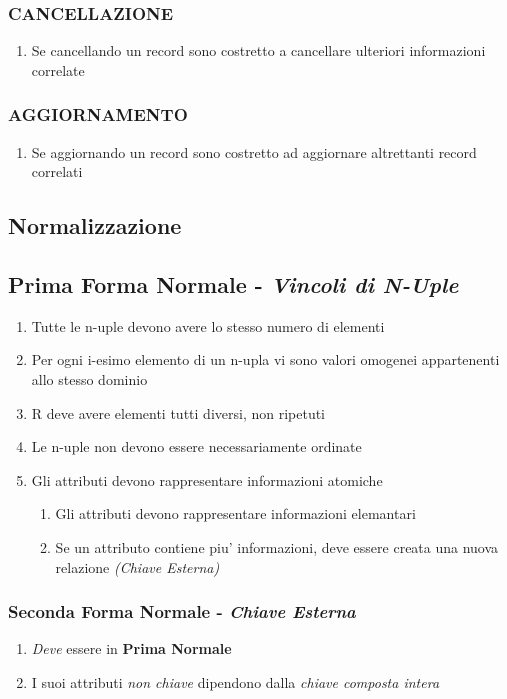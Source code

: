 \documentclass[a4paper, 12pt]{report}
\begin{document}
   \subsubsection{CANCELLAZIONE}
   \begin{enumerate}
       \item Se cancellando un record sono costretto a cancellare ulteriori informazioni correlate
   \end{enumerate}
   \subsubsection{AGGIORNAMENTO}
   \begin{enumerate}
       \item Se aggiornando un record sono costretto ad aggiornare altrettanti record correlati
   \end{enumerate}
   \subsection{Normalizzazione}
   \subsection{Prima Forma Normale -\textit{ Vincoli di N-Uple}}
   \begin{enumerate}
       \item Tutte le n-uple devono avere lo stesso numero di elementi
       \item Per ogni i-esimo elemento di un n-upla vi sono valori omogenei appartenenti allo stesso dominio
      \item R deve avere elementi tutti diversi, non ripetuti
      \item Le n-uple non devono essere necessariamente ordinate
      \item Gli attributi devono rappresentare informazioni atomiche
      \begin{enumerate}
          \item Gli attributi devono rappresentare informazioni elemantari
          \item Se un attributo contiene piu' informazioni, deve essere creata una nuova relazione\textit{ (Chiave Esterna)}
      \end{enumerate}
   \end{enumerate}
   \subsubsection{Seconda Forma Normale - \textit{Chiave Esterna}}
   \begin{enumerate}
       \item \textit{Deve} essere in \textbf{Prima Normale} 
       \item I suoi attributi \textit{non chiave} dipendono dalla \textit{chiave composta intera}
   \end{enumerate}
\end{document}
